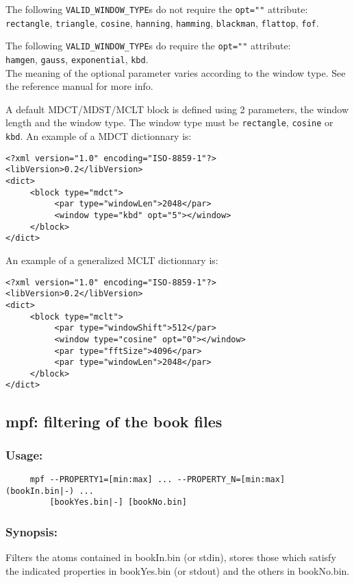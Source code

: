 \documentclass[11pt,a4paper]{article}
\begin{document}
\begin{itemize}
  The following \verb+VALID_WINDOW_TYPE+s do not require the \verb+opt=""+
  attribute: \\ \verb+rectangle+, \verb+triangle+, \verb+cosine+, \verb+hanning+,
  \verb+hamming+, \verb+blackman+, \verb+flattop+, \verb+fof+.
  
  The following \verb+VALID_WINDOW_TYPE+s do require the \verb+opt=""+
  attribute: \\ \verb+hamgen+, \verb+gauss+, \verb+exponential+, \verb+kbd+. \\
  The meaning of the optional parameter varies according to the window type.
  See the reference manual for more info.

\end{itemize}
A default MDCT/MDST/MCLT block is defined using 2 parameters, the window length and the window type. The window type must be \verb+rectangle+, \verb+cosine+ or \verb+kbd+. An example of a MDCT dictionnary is:
\begin{verbatim}
<?xml version="1.0" encoding="ISO-8859-1"?>
<libVersion>0.2</libVersion>
<dict>
     <block type="mdct">
          <par type="windowLen">2048</par>
          <window type="kbd" opt="5"></window>
     </block>
</dict>                 
\end{verbatim}
An example of a generalized MCLT dictionnary is:
\begin{verbatim}
<?xml version="1.0" encoding="ISO-8859-1"?>
<libVersion>0.2</libVersion>
<dict>
     <block type="mclt">
          <par type="windowShift">512</par>
          <window type="cosine" opt="0"></window>
          <par type="fftSize">4096</par>
          <par type="windowLen">2048</par>
     </block>
</dict>
\end{verbatim}

\clearpage
\subsection{mpf: filtering of the book files}

\subsubsection*{Usage:}
\begin{verbatim}
     mpf --PROPERTY1=[min:max] ... --PROPERTY_N=[min:max] (bookIn.bin|-) ...
         [bookYes.bin|-] [bookNo.bin]
\end{verbatim}

\subsubsection*{Synopsis:}
Filters the atoms contained in bookIn.bin (or stdin), stores those which
satisfy the indicated properties in bookYes.bin (or stdout) and the others in
bookNo.bin.
\end{document}
